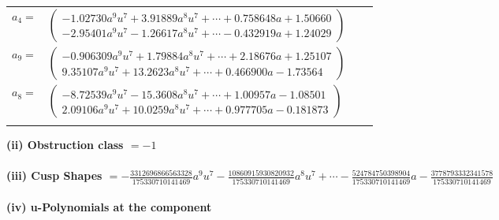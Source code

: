 \documentclass[1p]{elsarticle_modified}
\theoremstyle{definition}
\begin{document}
\begin{tabular}{m{7pt} m{180pt} m{7pt} m{180pt} }
\flushright $a_{4}=$&$\begin{pmatrix}-1.02730 a^{9} u^{7}+3.91889 a^{8} u^{7}+\cdots+0.758648 a+1.50660\\-2.95401 a^{9} u^{7}-1.26617 a^{8} u^{7}+\cdots-0.432919 a+1.24029\end{pmatrix}$ \\
\flushright $a_{9}=$&$\begin{pmatrix}-0.906309 a^{9} u^{7}+1.79884 a^{8} u^{7}+\cdots+2.18676 a+1.25107\\9.35107 a^{9} u^{7}+13.2623 a^{8} u^{7}+\cdots+0.466900 a-1.73564\end{pmatrix}$ \\
\flushright $a_{8}=$&$\begin{pmatrix}-8.72539 a^{9} u^{7}-15.3608 a^{8} u^{7}+\cdots+1.00957 a-1.08501\\2.09106 a^{9} u^{7}+10.0259 a^{8} u^{7}+\cdots+0.977705 a-0.181873\end{pmatrix}$\\&\end{tabular}
\flushleft \textbf{(ii) Obstruction class $= -1$}\\~\\
\flushleft \textbf{(iii) Cusp Shapes $= -\frac{3312696866563328}{175330710141469} a^9 u^7-\frac{10860915930820932}{175330710141469} a^8 u^7+\cdots-\frac{524784750398904}{175330710141469} a-\frac{3778793332341578}{175330710141469}$}\\~\\
\newpage\renewcommand{\arraystretch}{1}
\flushleft \textbf{(iv) u-Polynomials at the component}\newline \\
\end{document}

